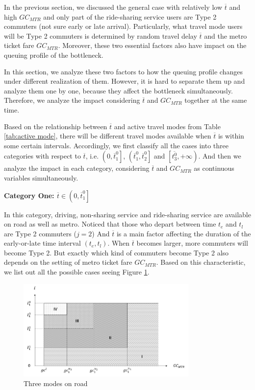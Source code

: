 \documentclass[a4paper,11pt]{article}
\begin{document}
In the previous section, we discussed the general case with relatively low $\overline{t}$ and high $GC_{MTR}$ and only part of the ride-sharing service users are Type 2 commuters (not sure early or late arrival). Particularly, what travel mode users will be Type 2 commuters is determined by random travel delay $\overline{t}$ and the metro ticket fare $GC_{MTR}$. Moreover, these two essential factors also have impact on the queuing profile of the bottleneck. 

In this section, we analyze these two factors to how the queuing profile changes under different realization of them. However, it is hard to separate them up and analyze them one by one, because they affect the bottleneck simultaneously. Therefore, we analyze the impact considering $\overline{t}$ and $GC_{MTR}$ together at the same time.

Based on the relationship between $\overline{t}$ and active travel modes from Table \ref{tab:active mode}, there will be different travel modes available when $\overline{t}$ is within some certain intervals. Accordingly, we first classify all the cases into three categories with respect to $\overline{t}$, i.e.  $\left(0, \overline{t}^0_1 \right]$, $\left(\overline{t}^0_1, \overline{t}^0_2\right]$ and $\left[\overline{t^0_3}, +\infty\right)$. And then we analyze the impact in each category, considering $\overline{t}$ and $GC_{MTR}$ as continuous variables simultaneously. 

\textbf{Category One: $\overline{t} \in \left(0, \overline{t}^0_1 \right]$}

In this category, driving, non-sharing service and ride-sharing service are available on road as well as metro. Noticed that those who depart between time $t_e$ and $t_l$ are Type 2 commuters ($j=2$) And $\overline{t}$ is a main factor affecting the duration of the early-or-late time interval $(t_e,t_l)$. When $\overline{t}$ becomes larger, more commuters will become Type 2. But exactly which kind of commuters become Type 2 also depends on the setting of metro ticket fare $GC_{MTR}$. Based on this characteristic, we list out all the possible cases seeing Figure \ref{fig:Three-mode cases}.

\begin{figure}
	\centering
	\includegraphics[width=3.5in]{image/Three-mode.jpg}
	\caption{Three modes on road}
	\label{fig:Three-mode cases}
\end{figure}
\end{document}
